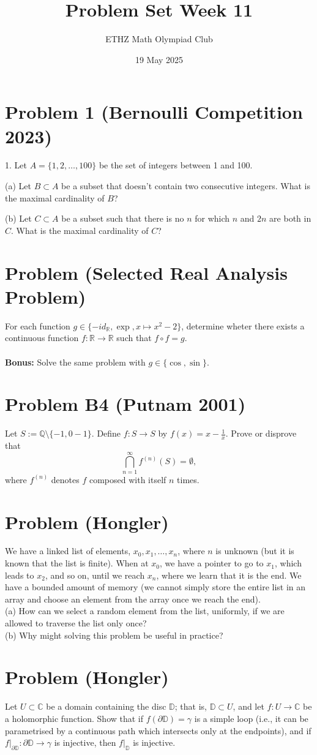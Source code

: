 \documentclass[11pt, a4paper, oneside]{article}
\title{Problem Set Week 11}
\author{ETHZ Math Olympiad Club}
\date{19 May 2025}
\newcommand{\problem}[1][]{\section{#1} \hfill \par}
\theoremstyle{remark}
\theoremstyle{lemma}
\begin{document}
\maketitle
\problem[Problem 1 (Bernoulli Competition 2023)]
1. Let \( A = \{1, 2, \ldots, 100\} \) be the set of integers between 1 and 100.

(a) Let \( B \subset A \) be a subset that doesn't contain two consecutive integers. What is the maximal cardinality of \( B \)?

(b) Let \( C \subset A \) be a subset such that there is no \( n \) for which \( n \) and \( 2n \) are both in \( C \). What is the maximal cardinality of \( C \)?

\problem[Problem (Selected Real Analysis Problem)]
For each function \(g\in\{-id_{\mathbb{R}}, \exp, x\mapsto x^2-2\}\), determine wheter there exists a continuous function $f:\mathbb{R}\rightarrow\mathbb{R}$ such that $f\circ f = g$.
\\\\
\textbf{Bonus:} Solve the same problem with $g\in\{\cos,\sin\}$.

\problem[Problem B4 (Putnam 2001)]
Let \( S:=\mathbb{Q}\setminus\{-1,0-1\} \). Define \( f : S \to S \) by  
\( f(x) = x - \frac{1}{x} \). Prove or disprove that  
\[
\bigcap_{n=1}^{\infty} f^{(n)}(S) = \emptyset,
\]
where \( f^{(n)} \) denotes \( f \) composed with itself \( n \) times.

\problem[Problem (Hongler)]
We have a linked list of elements, \(x_{0}, x_{1}, \ldots, x_{n}\), where \(n\) is unknown (but it is known that the list is finite). When at \(x_{0}\), we have a pointer to go to \(x_{1}\), which leads to \(x_{2}\), and so on, until we reach \(x_{n}\), where we learn that it is the end. We have a bounded amount of memory (we cannot simply store the entire list in an array and choose an element from the array once we reach the end).\\
(a) How can we select a random element from the list, uniformly, if we are allowed to traverse the list only once?\\
(b) Why might solving this problem be useful in practice?\\



\problem[Problem (Hongler)]
Let \( U \subset \mathbb{C} \) be a domain containing the disc \( \mathbb{D} \); that is, \( \mathbb{D} \subset U \), and let \( f : U \to \mathbb{C} \) be a holomorphic function. Show that if \( f\left( \partial \mathbb{D} \right) = \gamma \) is a simple loop (i.e., it can be parametrised by a continuous path which intersects only at the endpoints), and if \( f|_{\partial \mathbb{D}} : \partial \mathbb{D} \to \gamma \) is injective, then \( f|_{\mathbb{D}} \) is injective.
\end{document}
